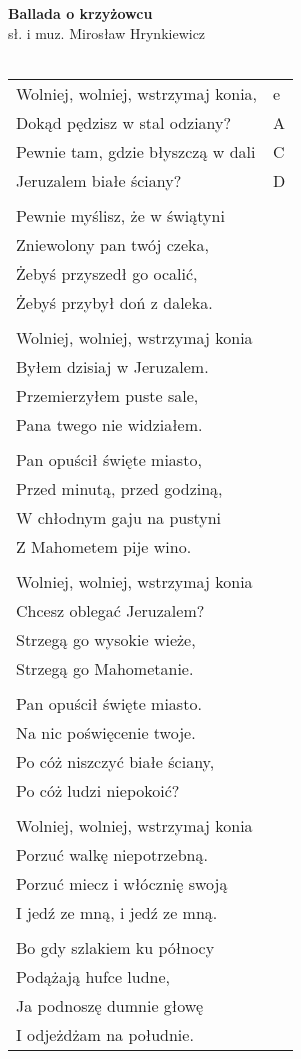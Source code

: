 \documentclass[a5paper]{article}
\begin{document}


\noindent
\fontsize{12pt}{15pt}\selectfont
\textbf{Ballada o krzyżowcu} \\
\fontsize{8pt}{10pt}\selectfont
sł. i muz. Mirosław Hrynkiewicz \\ \\
\fontsize{10pt}{12pt}\selectfont
{}
\begin{tabular}{@{}p{7.5cm}p{3cm}@{}}
\noindent
Wolniej, wolniej, wstrzymaj konia, & e \\
Dokąd pędzisz w stal odziany? & A \\
Pewnie tam, gdzie błyszczą w dali & C \\
Jeruzalem białe ściany? & D \\ \\

Pewnie myślisz, że w świątyni \\
Zniewolony pan twój czeka, \\
Żebyś przyszedł go ocalić, \\
Żebyś przybył doń z daleka. \\ \\

Wolniej, wolniej, wstrzymaj konia\\
Byłem dzisiaj w Jeruzalem.\\
Przemierzyłem puste sale,\\
Pana twego nie widziałem.\\\\

Pan opuścił święte miasto, \\
Przed minutą, przed godziną,\\
W chłodnym gaju na pustyni\\
Z Mahometem pije wino.\\\\

Wolniej, wolniej, wstrzymaj konia\\
Chcesz oblegać Jeruzalem?\\
Strzegą go wysokie wieże,\\
Strzegą go Mahometanie.\\\\

Pan opuścił święte miasto.\\
Na nic poświęcenie twoje.\\
Po cóż niszczyć białe ściany,\\
Po cóż ludzi niepokoić?\\\\

Wolniej, wolniej, wstrzymaj konia\\
Porzuć walkę niepotrzebną.\\
Porzuć miecz i włócznię swoją\\
I jedź ze mną, i jedź ze mną.\\\\

Bo gdy szlakiem ku północy\\
Podążają hufce ludne,\\
Ja podnoszę dumnie głowę\\
I odjeżdżam na południe.
\end{tabular}
\end{document}
